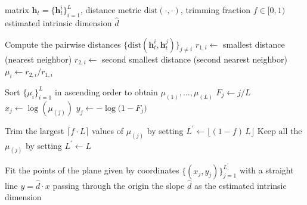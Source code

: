 \begin{algorithm}
\caption{Calculation of Intrinsic Dimension with Two-Nearest-Neighbour Estimation}
\small
\begin{algorithmic}[1]
\Require matrix $\mathbf{h}_{t} = \{\mathbf{h}^{i}_{t}\}_{i=1}^L$, distance metric $\mathrm{dist}(\cdot, \cdot)$, trimming fraction $f \in [0,1)$ 
\Ensure estimated intrinsic dimension $\hat d$

  \State Compute the pairwise distances $\{\mathrm{dist}(\mathbf{h}^{i}_{t}, \mathbf{h}^{j}_{t})\}_{j \ne i}$
  \State $r_{1,i} \gets$ smallest distance (nearest neighbor)
  \State $r_{2,i} \gets$ second smallest distance (second nearest neighbor)
  \State $\mu_i \gets r_{2,i} / r_{1,i}$
\EndFor

\State Sort $\{\mu_i\}^{L}_{i=1}$ in ascending order to obtain $\mu_{(1)}, \ldots, \mu_{(L)}$
  \State $F_j \gets j / L$
  \State $x_j \gets \log(\mu_{(j)})$
  \State $y_j \gets -\log\bigl(1 - F_j\bigr)$
\EndFor

  \State Trim the largest $\lceil f \cdot L \rceil$ values of $\mu_{(j)}$ by setting $L^{'} \gets \lfloor (1 - f)\,L \rfloor$
\Else
  \State Keep all the $\mu_{(j)}$ by setting $L^{'}\gets L$
\EndIf

\State Fit the points of the plane given by coordinates $\{(x_j,y_j)\}^{{L}^{'}}_{j=1}$ with a straight
line $y = \hat d \cdot x$ passing through the origin
\State \Return the slope $\hat d$ as the estimated intrinsic dimension
\end{algorithmic}
\label{alg:intrinsic_dimension}
\end{algorithm}